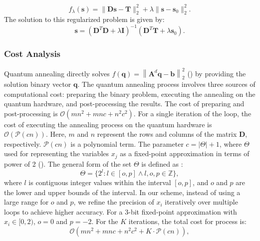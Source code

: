 \begin{equation}
f_\lambda(\mathbf{s}) = \| \mathbf{D} \mathbf{s} - \mathbf{T} \|_2^2 + \lambda \| \mathbf{s} - \mathbf{s}_0 \|_2^2.
\end{equation}
The solution to this regularized problem is given by:
\begin{equation}
\mathbf{s} = \left( \mathbf{D}^T \mathbf{D} + \lambda \mathbf{I} \right)^{-1} \left( \mathbf{D}^T \mathbf{T} + \lambda \mathbf{s}_0 \right).
\label{eq:ch3-tikhonov-solution}
\end{equation}

\subsubsection{Cost Analysis}

Quantum annealing directly solves \(f(\mathbf{q}) = \left\| \mathbf{A}^d \mathbf{q} - \mathbf{b} \right\|^2_2\) () by providing the solution binary vector \(\mathbf{q}\). The quantum annealing process involves three sources of computational cost: preparing the binary problem, executing the annealing on the quantum hardware, and post-processing the results. The cost of preparing and post-processing is \(\mathcal{O}(mn^2 + mnc + n^2c^2)\). For a single iteration of the loop, the cost of executing the annealing process on the quantum hardware is \(\mathcal{O}(\mathcal{P}(cn))\). Here, \(m\) and \(n\) represent the rows and columns of the matrix \(\mathbf{D}\), respectively. \(\mathcal{P}(cn)\) is a polynomial term. The parameter \(c = |\Theta| + 1\), where \(\Theta\) used for representing the variables \(x_j\) as a fixed-point approximation in terms of power of 2 (). The general form of the set \(\Theta\) is defined as \cite{borle19}:
\begin{equation}
    \Theta = \{ 2^l : l \in [o, p] \land l, o, p \in \mathbb{Z} \},
\end{equation}
where \(l\) is contiguous integer values within the interval \([o, p]\), and \(o\) and \(p\) are the lower and upper bounds of the interval. In our scheme, instead of using a large range for \(o\) and \(p\), we refine the precision of \(x_i\) iteratively over multiple loops to achieve higher accuracy. For a 3-bit fixed-point approximation with $x_i \in [0, 2)$, \(o = 0\) and \(p = -2\). For the \(K\) iterations, the total cost for  process is:
\begin{equation}
    \mathcal{O}(mn^2 + mnc + n^2c^2 + K\cdot\mathcal{P}(cn)),
    \label{eq:ch3-cost-annealing}
\end{equation}

